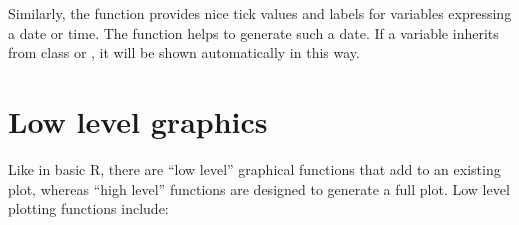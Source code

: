 \documentclass[11pt]{article}\usepackage[]{graphicx}\usepackage[]{color}
\begin{document}
\label{options.dateaxis}
Similarly, the function  provides nice tick values and labels 
for variables expressing a date or time. 
The function  helps to generate such a date. 
If a variable inherits from class  or , it will be shown
automatically in this way.

\section{Low level graphics}

Like in basic R, there are ``low level'' graphical functions that
add to an existing plot, whereas ``high level'' functions are designed to 
generate a full plot. Low level plotting functions include:
\end{document}
